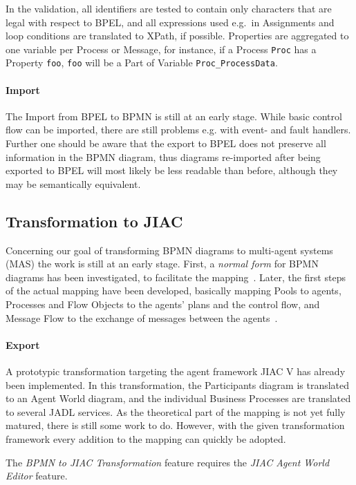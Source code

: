 In the validation, all identifiers are tested to contain only characters that are legal with respect
to BPEL, and all expressions used e.g.\ in Assignments and loop conditions are translated to XPath,
if possible. Properties are aggregated to one variable per Process or Message, for instance, if a
Process \texttt{Proc} has a Property \texttt{foo}, \texttt{foo} will be a Part of Variable
\texttt{Proc\_ProcessData}.

\paragraph{Import}
The Import from BPEL to BPMN is still at an early stage. While basic control flow can be imported,
there are still problems e.g. with event- and fault handlers. Further one should be aware that the
export to BPEL does not preserve all information in the BPMN diagram, thus diagrams re-imported
after being exported to BPEL will most likely be less readable than before, although they may be
semantically equivalent.


\subsection{Transformation to JIAC}
\label{sec:user_trafo_jiac}

Concerning our goal of transforming BPMN diagrams to multi-agent systems (MAS) the work is still at
an early stage. First, a \emph{normal form} for BPMN diagrams has been investigated, to facilitate
the mapping~\cite{endert2007towards}. Later, the first steps of the actual mapping have been
developed, basically mapping Pools to agents, Processes and Flow Objects to the agents' plans and
the control flow, and Message Flow to the exchange of messages between the
agents~\cite{endert2007mapping}.

\paragraph{Export}
A prototypic transformation targeting the agent framework JIAC V has already been implemented. In
this transformation, the Participants diagram is translated to an Agent World diagram, and the
individual Business Processes are translated to several JADL services. As the theoretical part of
the mapping is not yet fully matured, there is still some work to do. However, with the given
transformation framework every addition to the mapping can quickly be adopted.

The \emph{BPMN to JIAC Transformation} feature requires the \emph{JIAC Agent World Editor} feature.


